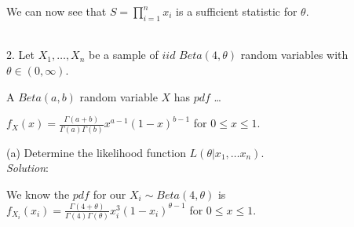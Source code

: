 \documentclass[12pt]{article}
\newcommand{\XB}{\color{black}}
\newcommand{\XBB}{\color{blue}}
\newcommand{\XV}{\color{violet}}
\begin{document}
\noindent
We can now see that $ \displaystyle S = \prod_{i=1}^{n} x_{i} $ is a sufficient statistic for $ \theta $.


\newpage
\XBB\hrulefill\XB \\

2. Let $ X_{1},\dots,X_{n} $ be a sample of $ iid $ $ Beta(4, \theta) $ random variables with $ \theta \in (0, \infty) $.

A $ Beta(a,b) $ random variable $ X $ has $ pdf $ \dots \\
\begin{center}
    $ \displaystyle f_{X}(x) = \frac{\Gamma(a + b)}{\Gamma(a)\Gamma(b)}x^{a - 1}(1 - x)^{b - 1} $ for $ 0 \leq x \leq 1 $. \\
\end{center}

\XBB\hrulefill\XB
\vspace{5mm}


(a) Determine the likelihood function $ L(\theta | x_{1}, \dots x_{n}) $.
\vspace{2.5mm} \\
\textit{Solution}:
\vspace{2.5mm}

\noindent
We know the $ pdf $ for our $ \displaystyle X_{i} \sim Beta(4, \theta) $ is $ \displaystyle f_{X_{i}}(x_{i}) = \frac{\Gamma(4 + \theta)}{\Gamma(4)\Gamma(\theta)}x_{i}^{3}(1 - x_{i})^{\theta - 1} $ for $ 0 \leq x \leq 1 $. \\
\end{document}
